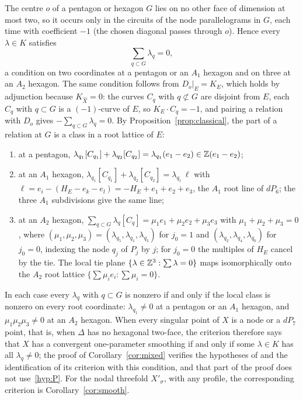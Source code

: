 \begin{remark}\label{rem:tie}
The centre $o$ of a pentagon or hexagon $G$ lies on no other face of dimension at most two, so it occurs only in the
circuits of the node parallelograms in $G$, each time with coefficient $-1$ (the chosen diagonal passes through $o$).
Hence every $\lambda\in K$ satisfies
\[
\sum_{q\subset G}\lambda_q=0,
\]
a condition on two coordinates at a pentagon or an $A_1$ hexagon and on three at an $A_2$ hexagon. The same condition
follows from $D_o|_E=K_E$, which holds by adjunction because $K_{\widehat X}=0$: the curves $C_q$ with $q\not\subset G$ are
disjoint from $E$, each $C_q$ with $q\subset G$ is a $(-1)$-curve of $E$, so $K_E\cdot C_q=-1$, and pairing a relation with $D_o$
gives $-\sum_{q\subset G}\lambda_q=0$. By Proposition~\ref{prop:classical}, the part of a relation at $G$ is a class in a
root lattice of $E$:
\begin{enumerate}
\item at a pentagon, $\lambda_{q_1}[C_{q_1}]+\lambda_{q_2}[C_{q_2}]=\lambda_{q_1}(e_1-e_2)\in\mathbb Z(e_1-e_2)$;
\item at an $A_1$ hexagon, $\lambda_{q_1}[C_{q_1}]+\lambda_{q_2}[C_{q_2}]=\lambda_{q_1}\,\ell$ with
$\ell=e_i-(H_E-e_k-e_l)=-H_E+e_1+e_2+e_3$, the $A_1$ root line of $dP_6$; the three $A_1$ subdivisions give the same line;
\item at an $A_2$ hexagon, $\sum_{q\subset G}\lambda_q[C_q]=\mu_1e_1+\mu_2e_2+\mu_3e_3$ with $\mu_1+\mu_2+\mu_3=0$, where
$(\mu_1,\mu_2,\mu_3)=(\lambda_{q_5},\lambda_{q_1},\lambda_{q_3})$ for $j_0=1$ and $(\lambda_{q_2},\lambda_{q_4},\lambda_{q_0})$ for $j_0=0$,
indexing the node $q_j$ of $P_j$ by $j$; for $j_0=0$ the multiples of $H_E$ cancel by the tie. The local tie plane
$\{\lambda\in\mathbb Z^3:\sum\lambda=0\}$ maps isomorphically onto the $A_2$ root lattice $\{\sum\mu_ie_i:\sum\mu_i=0\}$.
\end{enumerate}
In each case every $\lambda_q$ with $q\subset G$ is nonzero if and only if the local class is nonzero on every root
coordinate: $\lambda_{q_1}\neq0$ at a pentagon or an $A_1$ hexagon, and $\mu_1\mu_2\mu_3\neq0$ at an $A_2$ hexagon. When
every singular point of $X$ is a node or a $dP_7$ point, that is, when $\Delta$ has no hexagonal two-face, the criterion
\cite[Thm.~4.7]{Paper5} therefore says that $X$ has a convergent one-parameter smoothing if and only if some
$\lambda\in K$ has all $\lambda_q\neq0$; the proof of Corollary~\ref{cor:mixed} verifies the hypotheses of
\cite[Thm.~4.7]{Paper5} and the identification of its criterion with this condition, and that part of the proof does not
use~\ref{hyp:P}. For the nodal
threefold $X'_\sigma$, with any profile, the corresponding criterion is Corollary~\ref{cor:smooth}.
\end{remark}

